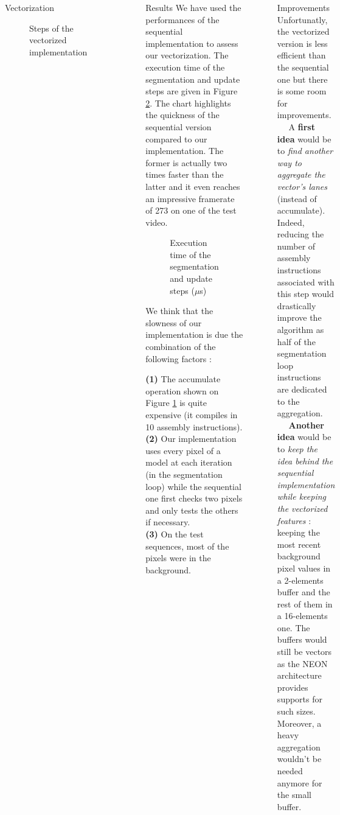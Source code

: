 \documentclass{beamer}
\begin{document}
\begin{columns}[t]
\begin{block}{Vectorization}
\begin{figure}
	\center
	\caption{Steps of the vectorized implementation}
	\label{fig:algo}
\end{figure}
\end{block}

\column{.45\paperwidth}
~~ 
\begin{block}{Results}
We have used the performances of the sequential implementation to assess our vectorization. The execution time of the segmentation and update steps are given in Figure \ref{fig:exec}. The chart highlights the quickness of the sequential version compared to our implementation. The former is actually two times faster than the latter and it even reaches an impressive framerate of 273 on one of the test video. 

\vspace{1cm}
\begin{figure}
	\center
	\label{fig:exec}
	\caption{Execution time of the segmentation and update steps ($\mu$s)}
\end{figure}
\vspace{1cm}

We think that the slowness of our implementation is due the combination of the following factors :

\begin{center}
\begin{minipage}{0.95\linewidth}
\textbf{(1)} The accumulate operation shown on Figure \ref{fig:algo} is quite expensive (it compiles in 10 assembly instructions). \\
\textbf{(2)} Our implementation uses every pixel of a model at each iteration (in the segmentation loop) while the sequential one first checks two pixels and only tests the others if necessary. \\
\textbf{(3)} On the test sequences, most of the pixels were in the background. 
\end{minipage}
\end{center}

\end{block}
~~ 
\begin{block}{Improvements}
Unfortunatly, the vectorized version is less efficient than the sequential one but there is some room for improvements. \\ 
~~
A \textbf{first idea} would be to \textit{find another way to aggregate the vector's lanes} (instead of accumulate). Indeed, reducing the number of assembly instructions associated with this step would drastically improve the algorithm as half of the segmentation loop instructions are dedicated to the aggregation. \\
~~ 
\textbf{Another idea} would be to \textit{keep the idea behind the sequential implementation while keeping the vectorized features} : keeping the most recent background pixel values in a 2-elements buffer and the rest of them in a 16-elements one. The buffers would still be vectors as the NEON architecture provides supports for such sizes. Moreover, a heavy aggregation wouldn't be needed anymore for the small buffer.
\end{block}


\end{columns}
\end{document}
